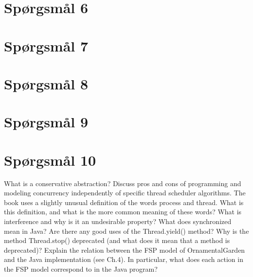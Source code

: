 \documentclass[a4paper,10p,danish]{article}
\begin{document}
\section*{Spørgsmål 6}
\section*{Spørgsmål 7}
\section*{Spørgsmål 8}
\section*{Spørgsmål 9}
\section*{Spørgsmål 10}

What is a conservative abstraction?
Discuss pros and cons of programming and modeling concurrency independently of specific thread scheduler algorithms.
The book uses a slightly unusual definition of the words process and thread. What is this definition, and what is the more common meaning of these words?
What is interference and why is it an undesirable property?
What does synchronized mean in Java?
Are there any good uses of the Thread.yield() method?
Why is the method Thread.stop() deprecated (and what does it mean that a method is deprecated)?
Explain the relation between the FSP model of OrnamentalGarden and the Java implementation (see Ch.4). In particular, what does each action in the FSP model correspond to in the Java program?
\end{document}
